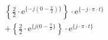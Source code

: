 \correct
\[
\begin{split}
&  \left \{ \frac{2}{2} \cdot \textrm{e}^{\{-j (0-\frac{\pi}{2}) \}} \right \} \cdot \textrm{e}^{\{-j \cdot \pi \cdot t \}} \\
&+ \left \{ \frac{2}{2} \cdot \textrm{e}^{\{j (0-\frac{\pi}{2} \}} \right \} \cdot \textrm{e}^{\{j \cdot \pi \cdot t \}}
\end{split}
\]
